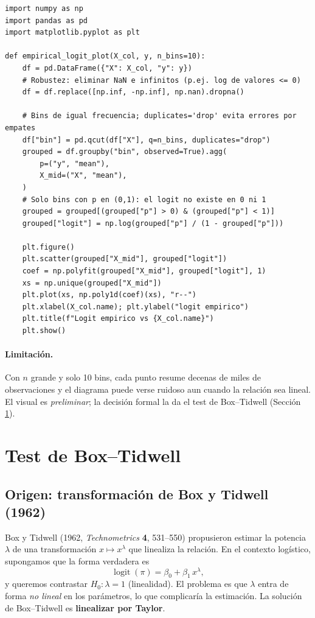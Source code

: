 \documentclass[11pt]{article}
\theoremstyle{plain}
\theoremstyle{definition}
\theoremstyle{remark}
\newcommand{\logit}{\operatorname{logit}}
\begin{document}
\begin{lstlisting}[style=py, caption={Empirical logit plot con manejo de NaN e infinitos.}]
import numpy as np
import pandas as pd
import matplotlib.pyplot as plt

def empirical_logit_plot(X_col, y, n_bins=10):
    df = pd.DataFrame({"X": X_col, "y": y})
    # Robustez: eliminar NaN e infinitos (p.ej. log de valores <= 0)
    df = df.replace([np.inf, -np.inf], np.nan).dropna()

    # Bins de igual frecuencia; duplicates='drop' evita errores por empates
    df["bin"] = pd.qcut(df["X"], q=n_bins, duplicates="drop")
    grouped = df.groupby("bin", observed=True).agg(
        p=("y", "mean"),
        X_mid=("X", "mean"),
    )
    # Solo bins con p en (0,1): el logit no existe en 0 ni 1
    grouped = grouped[(grouped["p"] > 0) & (grouped["p"] < 1)]
    grouped["logit"] = np.log(grouped["p"] / (1 - grouped["p"]))

    plt.figure()
    plt.scatter(grouped["X_mid"], grouped["logit"])
    coef = np.polyfit(grouped["X_mid"], grouped["logit"], 1)
    xs = np.unique(grouped["X_mid"])
    plt.plot(xs, np.poly1d(coef)(xs), "r--")
    plt.xlabel(X_col.name); plt.ylabel("logit empirico")
    plt.title(f"Logit empirico vs {X_col.name}")
    plt.show()
\end{lstlisting}

\paragraph{Limitación.} Con $n$ grande y solo 10 bins, cada punto resume
decenas de miles de observaciones y el diagrama puede verse ruidoso aun cuando
la relación sea lineal. El visual es \emph{preliminar}; la decisión formal la da
el test de Box--Tidwell (Sección \ref{sec:boxtidwell}).

\section{Test de Box--Tidwell}\label{sec:boxtidwell}

\subsection{Origen: transformación de Box y Tidwell (1962)}

Box y Tidwell (1962, \emph{Technometrics} \textbf{4}, 531--550) propusieron
estimar la potencia $\lambda$ de una transformación $x\mapsto x^\lambda$ que
linealiza la relación. En el contexto logístico, supongamos que la forma
verdadera es
\[
  \logit(\pi) = \beta_0 + \beta_1\, x^\lambda,
\]
y queremos contrastar $H_0:\lambda=1$ (linealidad). El problema es que $\lambda$
entra de forma \emph{no lineal} en los parámetros, lo que complicaría la
estimación. La solución de Box--Tidwell es \textbf{linealizar por Taylor}.
\end{document}
